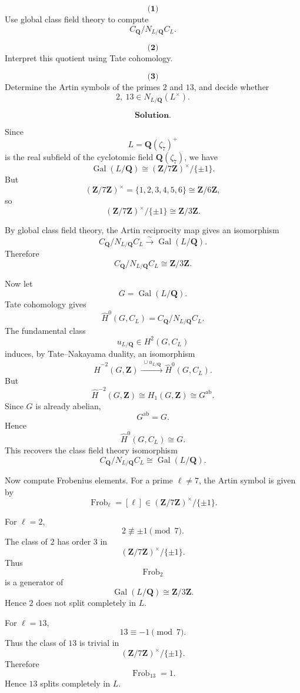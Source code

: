 {\[
\textbf{(1)}
\]
Use global class field theory to compute
\[
C_{\mathbf Q}/N_{L/\mathbf Q}C_L.
\]

\[
\textbf{(2)}
\]
Interpret this quotient using Tate cohomology.

\[
\textbf{(3)}
\]
Determine the Artin symbols of the primes \(2\) and \(13\), and decide whether
\[
2,\ 13\in N_{L/\mathbf Q}(L^\times).
\]

\[
\textbf{Solution.}
\]

Since
\[
L=\mathbf Q(\zeta_7)^+
\]
is the real subfield of the cyclotomic field \(\mathbf Q(\zeta_7)\), we have
\[
\operatorname{Gal}(L/\mathbf Q)
\cong
(\mathbf Z/7\mathbf Z)^\times/\{\pm1\}.
\]
But
\[
(\mathbf Z/7\mathbf Z)^\times
=
\{1,2,3,4,5,6\}
\cong \mathbf Z/6\mathbf Z,
\]
so
\[
(\mathbf Z/7\mathbf Z)^\times/\{\pm1\}
\cong \mathbf Z/3\mathbf Z.
\]

By global class field theory, the Artin reciprocity map gives an isomorphism
\[
C_{\mathbf Q}/N_{L/\mathbf Q}C_L
\xrightarrow{\sim}
\operatorname{Gal}(L/\mathbf Q).
\]
Therefore
\[
\boxed{
C_{\mathbf Q}/N_{L/\mathbf Q}C_L
\cong
\mathbf Z/3\mathbf Z.
}
\]

Now let
\[
G=\operatorname{Gal}(L/\mathbf Q).
\]
Tate cohomology gives
\[
\widehat H^0(G,C_L)
=
C_{\mathbf Q}/N_{L/\mathbf Q}C_L.
\]
The fundamental class
\[
u_{L/\mathbf Q}\in H^2(G,C_L)
\]
induces, by Tate--Nakayama duality, an isomorphism
\[
\widehat H^{-2}(G,\mathbf Z)
\xrightarrow{\;\cup u_{L/\mathbf Q}\;}
\widehat H^0(G,C_L).
\]
But
\[
\widehat H^{-2}(G,\mathbf Z)
\cong
H_1(G,\mathbf Z)
\cong
G^{\mathrm{ab}}.
\]
Since \(G\) is already abelian,
\[
G^{\mathrm{ab}}=G.
\]
Hence
\[
\widehat H^0(G,C_L)
\cong
G.
\]
This recovers the class field theory isomorphism
\[
C_{\mathbf Q}/N_{L/\mathbf Q}C_L
\cong
\operatorname{Gal}(L/\mathbf Q).
\]

Now compute Frobenius elements. For a prime \(\ell\neq 7\), the Artin symbol is given by
\[
\operatorname{Frob}_\ell
=
[\ell]\in
(\mathbf Z/7\mathbf Z)^\times/\{\pm1\}.
\]

For \(\ell=2\),
\[
2\not\equiv \pm1\pmod 7.
\]
The class of \(2\) has order \(3\) in
\[
(\mathbf Z/7\mathbf Z)^\times/\{\pm1\}.
\]
Thus
\[
\operatorname{Frob}_2
\]
is a generator of
\[
\operatorname{Gal}(L/\mathbf Q)\cong \mathbf Z/3\mathbf Z.
\]
Hence \(2\) does not split completely in \(L\).

For \(\ell=13\),
\[
13\equiv -1\pmod 7.
\]
Thus the class of \(13\) is trivial in
\[
(\mathbf Z/7\mathbf Z)^\times/\{\pm1\}.
\]
Therefore
\[
\operatorname{Frob}_{13}=1.
\]
Hence \(13\) splits completely in \(L\).

}

